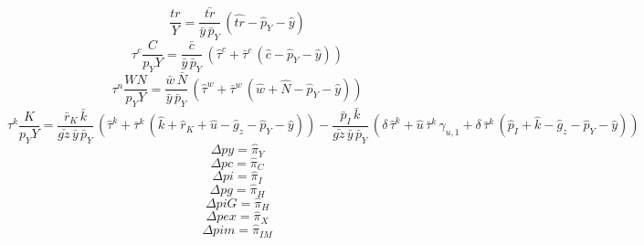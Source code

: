 \begin{dmath}
{\frac{tr}{Y}}=\frac{{\bar{tr}}}{{\bar{y}}\, {\bar{p}_Y}}\, \left({\hat{tr}}-{\hat{p}_Y}-{\hat{y}}\right)
\end{dmath}
\begin{dmath}
{{{\tau}^{c}}\frac{C}{{p_{Y}}Y}}=\frac{{\bar{c}}}{{\bar{y}}\, {\bar{p}_Y}}\, \left({\hat{\tau}^c}+{\bar{\tau}^c}\, \left({\hat{c}}-{\hat{p}_Y}-{\hat{y}}\right)\right)
\end{dmath}
\begin{dmath}
{{{\tau}^{n}}\frac{WN}{{p_{Y}}Y}}=\frac{{\bar{w}}\, {\bar{N}}}{{\bar{y}}\, {\bar{p}_Y}}\, \left({\hat{\tau}^w}+{\bar{\tau}^w}\, \left({\hat{w}}+{\hat{N}}-{\hat{p}_Y}-{\hat{y}}\right)\right)
\end{dmath}
\begin{dmath}
{{{\tau}^{k}}\frac{K}{{p_{Y}}Y}}=\frac{{\bar{r}_K}\, {\bar{k}}}{{\bar{gz}}\, {\bar{y}}\, {\bar{p}_Y}}\, \left({\hat{\tau}^k}+{\bar{\tau}^k}\, \left({\hat{k}}+{\hat{r}_K}+{\hat{u}}-{{\hat{g}_z}}-{\hat{p}_Y}-{\hat{y}}\right)\right)-\frac{{\bar{p}_I}\, {\bar{k}}}{{\bar{gz}}\, {\bar{y}}\, {\bar{p}_Y}}\, \left({\delta}\, {\hat{\tau}^k}+{\hat{u}}\, {\bar{\tau}^k}\, {\gamma_{u,1}}+{\delta}\, {\bar{\tau}^k}\, \left({\hat{p}_I}+{\hat{k}}-{{\hat{g}_z}}-{\hat{p}_Y}-{\hat{y}}\right)\right)
\end{dmath}
\begin{dmath}
{\Delta{py}}={\hat{\pi}_{Y}}
\end{dmath}
\begin{dmath}
{\Delta{pc}}={\hat{\pi}_{C}}
\end{dmath}
\begin{dmath}
{\Delta{pi}}={\hat{\pi}_{I}}
\end{dmath}
\begin{dmath}
{\Delta{pg}}={\hat{\pi}_{H}}
\end{dmath}
\begin{dmath}
{\Delta{piG}}={\hat{\pi}_{H}}
\end{dmath}
\begin{dmath}
{\Delta{pex}}={\hat{\pi}_{X}}
\end{dmath}
\begin{dmath}
{\Delta{pim}}={\hat{\pi}_{IM}}
\end{dmath}
